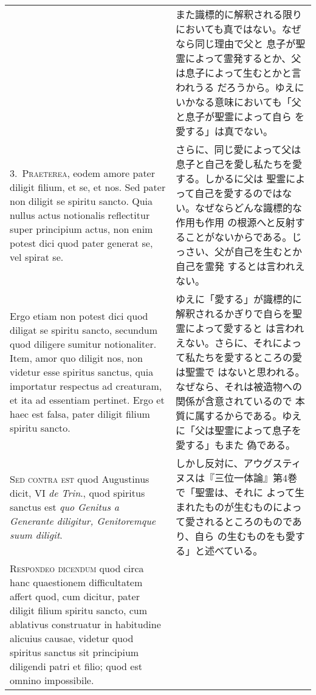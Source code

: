 \documentclass[10pt]{jsarticle} %
\begin{document}
\begin{longtable}{p{21em}p{21em}}
&

また識標的に解釈される限りにおいても真ではない。なぜなら同じ理由で父と
 息子が聖霊によって霊発するとか、父は息子によって生むとかと言われうる
 だろうから。ゆえにいかなる意味においても「父と息子が聖霊によって自ら
 を愛する」は真でない。
 

 
\\

3.~{\scshape Praeterea}, eodem amore pater diligit filium, et se, et
 nos. Sed pater non diligit se spiritu sancto. Quia nullus actus
 notionalis reflectitur super principium actus, non enim potest dici
 quod pater generat se, vel spirat se. 


&

さらに、同じ愛によって父は息子と自己を愛し私たちを愛する。しかるに父は
 聖霊によって自己を愛するのではない。なぜならどんな識標的な作用も作用
 の根源へと反射することがないからである。じっさい、父が自己を生むとか自己を霊発
 するとは言われえない。

\\


Ergo etiam non potest dici quod
 diligat se spiritu sancto, secundum quod diligere sumitur
 notionaliter. Item, amor quo diligit nos, non videtur esse spiritus
 sanctus, quia importatur respectus ad creaturam, et ita ad essentiam
 pertinet. Ergo et haec est falsa, pater diligit filium spiritu
 sancto.


&

ゆえに「愛する」が識標的に解釈されるかぎりで自らを聖霊によって愛すると
 は言われえない。さらに、それによって私たちを愛するところの愛は聖霊で
 はないと思われる。なぜなら、それは被造物への関係が含意されているので
 本質に属するからである。ゆえに「父は聖霊によって息子を愛する」もまた
 偽である。

\\

{\scshape Sed contra est} quod Augustinus dicit, VI {\itshape de Trin}., quod
 spiritus sanctus est {\itshape quo Genitus a Generante diligitur, Genitoremque
 suum diligit}.


&

しかし反対に、アウグスティヌスは『三位一体論』第4巻で「聖霊は、それに
 よって生まれたものが生むものによって愛されるところのものであり、自ら
 の生むものをも愛する」と述べている。

\\

{\scshape Respondeo dicendum} quod circa hanc quaestionem
 difficultatem affert quod, cum dicitur, pater diligit filium spiritu
 sancto, cum ablativus construatur in habitudine alicuius causae,
 videtur quod spiritus sanctus sit principium diligendi patri et
 filio; quod est omnino impossibile. 


\end{longtable}
\end{document}
